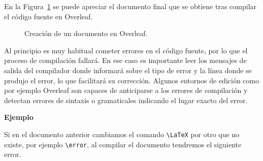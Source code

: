 \documentclass[
  a4paper,
]{scrreport}
\theoremstyle{definition}
\theoremstyle{remark}
\begin{document}
En la Figura~\ref{fig-overleaf-hola-latex} se puede apreciar el
documento final que se obtiene tras compilar el código fuente en
Overleaf.

\begin{figure}


\caption{\label{fig-overleaf-hola-latex}Creación de un documento en
Overleaf.}

\end{figure}%

Al principio es muy habitual cometer errores en el código fuente, por lo
que el proceso de compilación fallará. En ese caso es importante leer
los mensajes de salida del compilador donde informará sobre el tipo de
error y la línea donde se produjo el error, lo que facilitará su
corrección. Algunos entornos de edición como por ejemplo Overleaf son
capaces de anticiparse a los errores de compilación y detectan errores
de sintaxis o gramaticales indicando el lugar exacto del error.

\textbf{Ejemplo}

Si en el documento anterior cambiamos el comando
\texttt{\textbackslash{}LaTeX} por otro que no existe, por ejemplo
\texttt{\textbackslash{}error}, al compilar el documento tendremos el
siguiente error.
\end{document}
